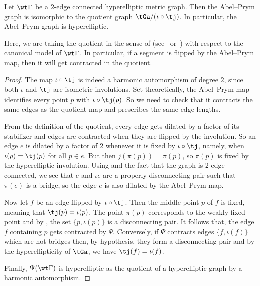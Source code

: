  
 \begin{lemma}\label{lem:quotientbyinvolution}
Let $\wt\Gamma$ be a $2$-edge connected  hyperelliptic metric graph. Then the Abel--Prym graph is isomorphic to the quotient graph $\tGa/{(\iota\circ \tj)}$. In particular, the Abel--Prym graph is hyperelliptic.
     \end{lemma}


Here, we are taking the quotient in the sense of (see~\cite[Section~2.2]{CH} or~\cite[Section~1.3]{LenUlirschZakharov_abelianCovers}) with respect to the canonical model of $\wt\Gamma$. In particular, if a segment is flipped by the Abel--Prym map, then it will get contracted in the quotient.  

  \begin{proof}  \label{graphModuloIJ}
The map $\iota\circ \tj$ is indeed a harmonic automorphism of degree $2$, since 
  both $\iota$ and $\tj$ are isometric involutions. 
    Set-theoretically,  the Abel--Prym map identifies every point $p$ with $\iota\circ\tj(p)$. So we need to check that it contracts the same edges as  the quotient map  and prescribes the same edge-lengths.

From the definition of the quotient,  
every edge gets dilated by a factor of its stabilizer and edges are contracted when they are flipped by the involution. So an edge $e$ is dilated by a factor of 2 whenever it is fixed by $\iota\circ\tj$, namely, when $\iota(p) = \tj(p)$ for all $p\in e$. But then $j(\pi(p)) = \pi(p)$, so $\pi(p)$ is fixed by the hyperelliptic involution. Using  and the fact that the graph is 2-edge-connected, we see that $e$ and $\iota e$ are a properly disconnecting pair such that $\pi(e)$ is a bridge, so the edge $e$ is also dilated by the Abel--Prym map. 
   
  Now let $f$ be an edge flipped by $\iota\circ\tj$. Then the middle point $p$ of $f$ is fixed, meaning that $\tj(p)=\iota(p)$. The point $\pi(p)$ corresponds to the weakly-fixed point  
 and  by , the set $\{p,\iota(p)\}$ is a disconnecting pair. It follows that, the edge $f$ containing $p$  gets contracted by $\Psi$. Conversely, if $\Psi$ contracts edges $\{f,\iota(f)\}$ which are not bridges then, by hypothesis, they form a disconnecting pair and by the hyperellipticity of $\tGa$, we have $\tj(f)=\iota(f)$.
  
         Finally, $\Psi(\wt\Gamma)$ is hyperelliptic as the quotient of a hyperelliptic graph by a harmonic automorphism.  
\end{proof}

